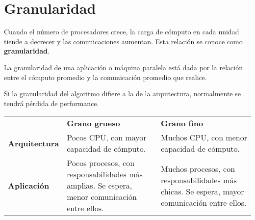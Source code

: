 \documentclass[a4paper, 10pt]{report}
\begin{document}
\section{Granularidad}

Cuando el número de procesadores crece, la carga de cómputo en cada unidad tiende a decrecer y las comunicaciones aumentan. Esta relación se conoce como \textbf{granularidad}.

La granularidad de una aplicación o máquina paralela está dada por la relación entre el cómputo promedio y la comunicación promedio que realice.

Si la granularidad del algoritmo difiere a la de la arquitectura, normalmente se tendrá pérdida de performance.

{\renewcommand{\arraystretch}{2}%
\begin{center}
\begin{tabular}{p{3cm} p{6cm} p{6cm}}
& \textbf{Grano grueso} & \textbf{Grano fino} \\
\textbf{Arquitectura} & Pocos CPU, con mayor capacidad de cómputo. & Muchos CPU, con menor capacidad de cómputo. \\
\hline
\textbf{Aplicación} & Pocos procesos, con responsabilidades más amplias. Se espera, menor comunicación entre ellos. & Muchos procesos, con responsabilidades más chicas. Se espera, mayor comunicación entre ellos. \\
\end{tabular}
\end{center}}
\end{document}
